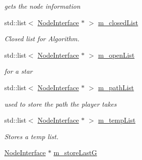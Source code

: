 \begin{DoxyCompactItemize}
\begin{DoxyCompactList}\small\item\em gets the node information \end{DoxyCompactList}\item 
\mbox{\label{class_graph_aac9c8808c01f24849a133d6d7a2f6da1}} 
std\+::list$<$ \mbox{\hyperlink{class_node_interface}{Node\+Interface}} $\ast$ $>$ \mbox{\hyperlink{class_graph_aac9c8808c01f24849a133d6d7a2f6da1}{m\+\_\+closed\+List}}
\begin{DoxyCompactList}\small\item\em Closed list for Algorithm. \end{DoxyCompactList}\item 
\mbox{\label{class_graph_a0c8c07939ba82d13c37e4d90ee7e0a03}} 
std\+::list$<$ \mbox{\hyperlink{class_node_interface}{Node\+Interface}} $\ast$ $>$ \mbox{\hyperlink{class_graph_a0c8c07939ba82d13c37e4d90ee7e0a03}{m\+\_\+open\+List}}
\begin{DoxyCompactList}\small\item\em for a star \end{DoxyCompactList}\item 
\mbox{\label{class_graph_adab78319a2cd41cabcbb84d091c85e00}} 
std\+::list$<$ \mbox{\hyperlink{class_node_interface}{Node\+Interface}} $\ast$ $>$ \mbox{\hyperlink{class_graph_adab78319a2cd41cabcbb84d091c85e00}{m\+\_\+path\+List}}
\begin{DoxyCompactList}\small\item\em used to store the path the player takes \end{DoxyCompactList}\item 
\mbox{\label{class_graph_a58a686e87cde1ce128b3bc5212c3104d}} 
std\+::list$<$ \mbox{\hyperlink{class_node_interface}{Node\+Interface}} $\ast$ $>$ \mbox{\hyperlink{class_graph_a58a686e87cde1ce128b3bc5212c3104d}{m\+\_\+temp\+List}}
\begin{DoxyCompactList}\small\item\em Stores a temp list. \end{DoxyCompactList}\item 
\mbox{\label{class_graph_a6654863b002b834e645b6987e56f8fae}} 
\mbox{\hyperlink{class_node_interface}{Node\+Interface}} $\ast$ \mbox{\hyperlink{class_graph_a6654863b002b834e645b6987e56f8fae}{m\+\_\+store\+LastG}}

\end{DoxyCompactItemize}
